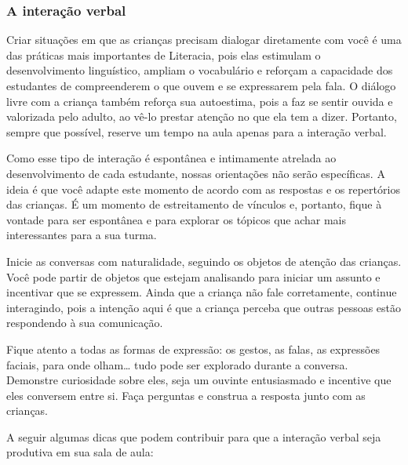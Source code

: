\documentclass[11pt]{extarticle}
\begin{document}
\subsubsection{A interação verbal} 
Criar situações em que as crianças precisam dialogar diretamente com 
você é uma das práticas mais importantes de Literacia, pois elas estimulam 
o desenvolvimento linguístico, ampliam o vocabulário e reforçam a 
capacidade dos estudantes de compreenderem o que ouvem e se expressarem 
pela fala. O diálogo livre com a criança também reforça sua autoestima, pois 
a faz se sentir ouvida e valorizada pelo adulto, ao vê-lo prestar atenção 
no que ela tem a dizer. Portanto, sempre que possível, reserve um tempo na 
aula apenas para a interação verbal. 

Como esse tipo de interação é espontânea e intimamente atrelada ao 
desenvolvimento de cada estudante, nossas orientações não serão específicas. 
A ideia é que você adapte este momento de acordo com as respostas e os 
repertórios das crianças. É um momento de estreitamento de vínculos e, portanto, 
fique à vontade para ser espontânea e para explorar os tópicos que achar 
mais interessantes para a sua turma.

Inicie as conversas com naturalidade, seguindo os objetos de atenção das crianças. 
Você pode partir de objetos que estejam analisando
para iniciar um assunto e incentivar que se expressem. Ainda que a
criança não fale corretamente, continue interagindo, 
pois a intenção aqui é que a criança perceba que outras pessoas estão respondendo 
à sua comunicação. 

Fique atento a todas as formas de expressão: os gestos, as falas, as 
expressões faciais, para onde olham\ldots{} tudo pode ser explorado durante a conversa. 
Demonstre curiosidade sobre eles, seja um ouvinte entusiasmado e incentive que eles 
conversem entre si. Faça perguntas e construa a resposta junto com as crianças. 

A seguir algumas dicas que podem contribuir para que a interação verbal 
seja produtiva em sua sala de aula: 
\end{document}

